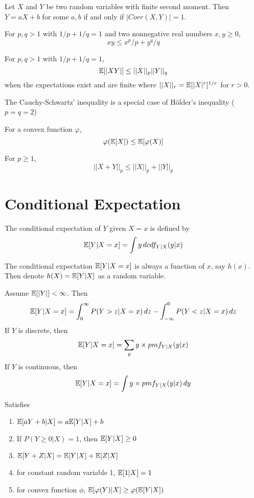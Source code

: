 \documentclass[11pt]{article}
\begin{document}
\theorem
Let $X$ and $Y$ be two random variables with finite second moment. Then $Y = aX + b$ for some $a,b$ if and only if $|Corr(X,Y)| = 1$.

For $p,q > 1$ with $1/p + 1/q = 1$ and two nonnegative real numbers $x,y \geq 0$,
$$xy \leq x^p/p + y^q /q$$

For $p,q > 1$ with $1/p + 1/q = 1$, $$\mathbb{E}[{|XY|}] \leq ||X||_p ||Y||_q$$ when the expectations exist and are finite where
$||X||_r = \mathbb{E}[{|X|^r}]^{1/r}$ for $r > 0$.

\remark The Cauchy-Schwartz' inequality is a special case of H\"older's inequality ($p=q=2$)

For a convex function $\varphi$, 
$$\varphi(\mathbb{E}[{X}]) \leq \mathbb{E}[{\varphi(X)}]$$

For $p \geq 1$, 
$$||X + Y||_p \leq ||X||_p + ||Y||_p$$

\section{Conditional Expectation}
The conditional expectation of $Y$ given $X = x$ is defined by
$$\mathbb{E}[{Y | X=x}] = \int y \, dcdf_{Y|X}(y|x)$$

\remark The conditional expectation $\mathbb{E}[{Y|X=x}]$ is always a function of $x$, say $h(x)$. Then denote $h(X) = \mathbb{E}[{Y|X}]$ as a random variable.

\theorem
Assume $\mathbb{E}[{|Y|}] < \infty$. Then
$$\mathbb{E}[{Y|X=x}] = \int_0^\infty P(Y > z|X=x) \, dz - \int_{-\infty}^0 P(Y<z|X=x)\, dz$$
If $Y$ is discrete, then
$$\mathbb{E}[{Y|X=x}] = \sum_y y \times pmf_{Y|X}(y|x)$$
If $Y$ is continuous, then
$$\mathbb{E}[{Y|X=x}] = \int y \times pmf_{Y|X}(y|x) \, dy$$

Satisfies
\begin{enumerate}
	\item $\mathbb{E}[{aY + b| X}] = a\mathbb{E}[{Y|X}] + b$
	\item If $P(Y \geq 0|X) = 1$, then $\mathbb{E}[{Y|X}] \geq 0$
	\item $\mathbb{E}[{Y + Z |X}] = \mathbb{E}[{Y|X}] + \mathbb{E}[{Z|X}]$
	\item for constant random variable 1, $\mathbb{E}[{1|X}] = 1$
	\item for convex function $\phi$, $\mathbb{E}[{\varphi(Y)|X}] \geq \varphi(\mathbb{E}[{Y|X}])$
\end{enumerate}
\end{document}
